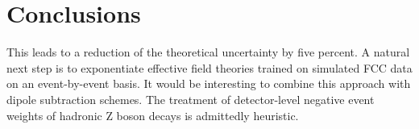\section{Conclusions}\label{sec:conclusions}

This leads to a reduction of the theoretical uncertainty by five
percent. A natural next step is to exponentiate effective field theories
trained on simulated FCC data on an event-by-event basis. It would be
interesting to combine this approach with dipole subtraction schemes.
The treatment of detector-level negative event weights of hadronic Z
boson decays is admittedly heuristic.

